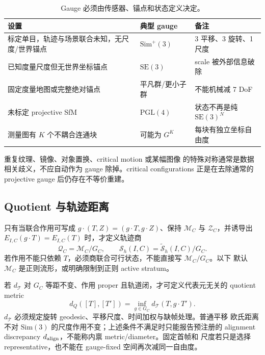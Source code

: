 \documentclass[UTF8,a4paper,11pt]{ctexart}
\newcommand{\SE}{\mathrm{SE}}
\newcommand{\Sim}{\mathrm{Sim}}
\newcommand{\PGL}{\mathrm{PGL}}
\newcommand{\Sset}{\mathcal S}
\newcommand{\Tspace}{\mathcal T}
\newcommand{\Mspace}{\mathcal M}
\newcommand{\Qspace}{\mathcal Q}
\begin{document}
\begin{table}[htbp]
\centering
\small
\begin{tabularx}{\textwidth}{>{\raggedright\arraybackslash}p{}
>{\centering\arraybackslash}p{}X}
\toprule
设置 & 典型 gauge & 备注\\
\midrule
标定单目，轨迹与场景联合未知，无尺度/世界锚点
  & $\Sim^{+}(3)$ & 3 平移、3 旋转、1 尺度\\
已知度量尺度但无世界坐标锚点
  & $\SE(3)$ & scale 被外部信息破除\\
固定度量地图或完整绝对锚点
  & 平凡群/更小子群 & 不能机械减 7 DoF\\
未标定 projective SfM
  & $\PGL(4)$ & 状态不再是纯 $\SE(3)^N$\\
测量图有 $K$ 个不耦合连通块
  & 可能为 $G^K$ & 每块有独立坐标自由度\\
\bottomrule
\end{tabularx}
\caption{Gauge 必须由传感器、锚点和状态定义决定。}
\end{table}

重复纹理、镜像、对象置换、critical motion\citep{sturm1997critical} 或某幅图像
的特殊对称通常是数据相关歧义，不应自动作为 gauge 除掉。critical configurations
正是在去除通常的 projective gauge 后仍存在不等价重建\citep{hartley2007critical}。

\subsection{Quotient 与轨迹距离}

只有当联合作用可写成
$g\!\cdot\!(T,Z)=(g\!\cdot T,g\!\cdot Z)$、保持 $\Mspace_C$ 与
$\mathcal Z_C$，并诱导出 $E_{I,C}(g\!\cdot T)=E_{I,C}(T)$ 时，才定义轨迹商
\begin{equation}
  \Qspace_C=\Mspace_C/G_C,
  \qquad
  \Sset_h(I,C)=\widetilde{\Sset}_h(I,C)/G_C.
\end{equation}
若作用不能只依赖 $T$，必须商联合可行状态，不能直接写 $\Mspace_C/G_C$。以下
默认 $\Mspace_C$ 是正则流形，或明确限制到正则 active stratum。

若 $d_{\Tspace}$ 对 $G_C$ 等距不变、作用 proper 且轨道闭，才可定义代表元无关的
quotient metric
\begin{equation}
  d_Q([T],[T'])=\inf_{g\in G_C}d_{\Tspace}(T,g\!\cdot T').
  \label{eq:quotient-distance}
\end{equation}
$d_{\Tspace}$ 必须规定旋转 geodesic、平移尺度、时间加权与缺帧处理。普通平移
欧氏距离不对 $\Sim(3)$ 的尺度作用不变；上述条件不满足时只能报告预注册的
alignment discrepancy $d_{\rm align}$，不能称内禀 metric/diameter。固定首帧和
尺度若只是选择 representative，也不能在 gauge-fixed 空间再次减同一自由度。
\end{document}
